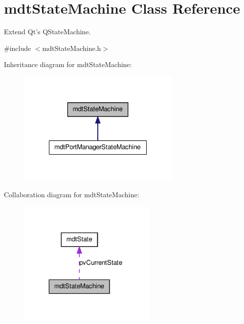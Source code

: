 \hypertarget{classmdt_state_machine}{
\section{mdtStateMachine Class Reference}
\label{classmdt_state_machine}
}


Extend Qt's QStateMachine.  




{\ttfamily \#include $<$mdtStateMachine.h$>$}



Inheritance diagram for mdtStateMachine:\nopagebreak
\begin{figure}[H]
\begin{center}
\leavevmode
\includegraphics[width=228pt]{classmdt_state_machine__inherit__graph}
\end{center}
\end{figure}


Collaboration diagram for mdtStateMachine:\nopagebreak
\begin{figure}[H]
\begin{center}
\leavevmode
\includegraphics[width=193pt]{classmdt_state_machine__coll__graph}
\end{center}
\end{figure}
